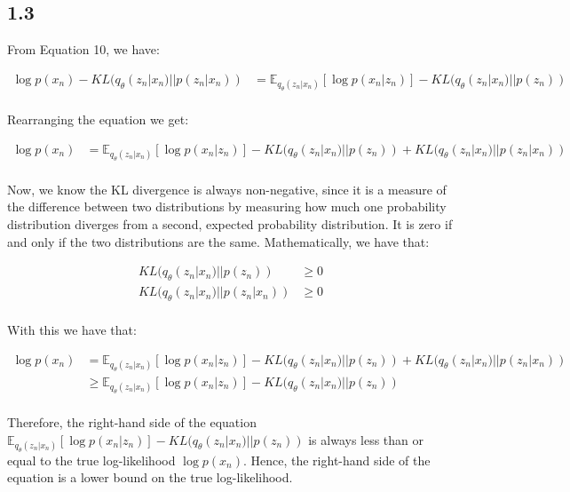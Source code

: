 \documentclass{article}
\begin{document}
\newpage
\subsection*{1.3}

From Equation 10, we have:

\begin{align*}
    \log p(x_n) - KL(q_{\theta}(z_n|x_n) || p(z_n|x_n)) &= \mathbb{E}_{q_{\theta}(z_n|x_n)}[\log p(x_n|z_n)] - KL(q_{\theta}(z_n|x_n) || p(z_n)) \\
\end{align*}

Rearranging the equation we get: 

\begin{align*}
    \log p(x_n) &= \mathbb{E}_{q_{\theta}(z_n|x_n)}[\log p(x_n|z_n)] - KL(q_{\theta}(z_n|x_n) || p(z_n)) + KL(q_{\theta}(z_n|x_n) || p(z_n|x_n)) \\
\end{align*}

Now, we know the KL divergence is always non-negative, since it is a measure of the difference between two distributions by
measuring how much one probability distribution diverges from a second, expected probability distribution. It is zero if and only if the two distributions are the same.
Mathematically, we have that: 

\begin{align*}
    KL(q_{\theta}(z_n|x_n) || p(z_n)) &\geq 0 \\
    KL(q_{\theta}(z_n|x_n) || p(z_n|x_n)) &\geq 0 \\
\end{align*}

With this we have that: 

\begin{align*}
  \log p(x_n) &= \mathbb{E}_{q_{\theta}(z_n|x_n)}[\log p(x_n|z_n)] - KL(q_{\theta}(z_n|x_n) || p(z_n)) + KL(q_{\theta}(z_n|x_n) || p(z_n|x_n)) \\
  &\geq \mathbb{E}_{q_{\theta}(z_n|x_n)}[\log p(x_n|z_n)] - KL(q_{\theta}(z_n|x_n) || p(z_n)) \\
\end{align*}

Therefore, the right-hand side of the equation $\mathbb{E}_{q_{\theta}(z_n|x_n)}[\log p(x_n|z_n)] - KL(q_{\theta}(z_n|x_n) || p(z_n))$ is
always less than or equal to the true log-likelihood $\log p(x_n)$. Hence, the right-hand side of the equation is a lower bound on the true log-likelihood.
\end{document}
